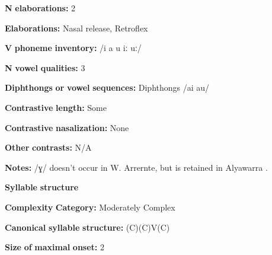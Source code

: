 \begin{styleBody}
\textbf{N} \textbf{elaborations:} 2
\end{styleBody}

\begin{styleBody}
\textbf{Elaborations:} Nasal release, Retroflex
\end{styleBody}

\begin{styleBody}
\textbf{V} \textbf{phoneme} \textbf{inventory:} /i a u iː uː/
\end{styleBody}

\begin{styleBody}
\textbf{N} \textbf{vowel} \textbf{qualities:} 3
\end{styleBody}

\begin{styleBody}
\textbf{Diphthongs} \textbf{or} \textbf{vowel} \textbf{sequences:} Diphthongs /ai au/
\end{styleBody}

\begin{styleBody}
\textbf{Contrastive} \textbf{length:} Some
\end{styleBody}

\begin{styleBody}
\textbf{Contrastive} \textbf{nasalization:} None
\end{styleBody}

\begin{styleBody}
\textbf{Other} \textbf{contrasts:} N/A
\end{styleBody}

\begin{styleBody}
\textbf{Notes:} /ɣ/ doesn’t occur in W. Arrernte, but is retained in Alyawarra \citep[12]{Yallop1977}.
\end{styleBody}

\begin{styleBody}
\textbf{Syllable} \textbf{structure}
\end{styleBody}

\begin{styleBody}
\textbf{Complexity} \textbf{Category:} Moderately Complex
\end{styleBody}

\begin{styleBody}
\textbf{Canonical} \textbf{syllable} \textbf{structure:} (C)(C)V(C) \citep[41-5]{Yallop1977}
\end{styleBody}

\begin{styleBody}
\textbf{Size} \textbf{of} \textbf{maximal} \textbf{onset:} 2
\end{styleBody}

